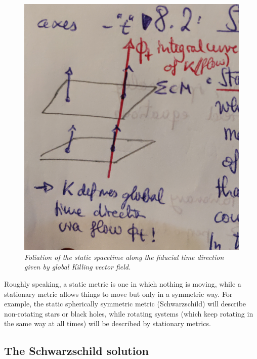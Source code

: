 \begin{figure}
	\centering
	\includegraphics[width=0.7\linewidth]{gfx/staticspacetime}
	\caption{\itshape Foliation of the static spacetime along the fiducial time direction given by global Killing vector field.}
	\label{fig:staticspacetime}
\end{figure}
Roughly speaking, a static metric is one in which nothing is moving,
while a stationary metric allows things to move but only in a symmetric way. For example,
the static spherically symmetric metric (Schwarzschild) will describe non-rotating stars or black holes,
while rotating systems (which keep rotating in the same way at all times) will be described
by stationary metrics.
 \subsection{The Schwarzschild solution}

